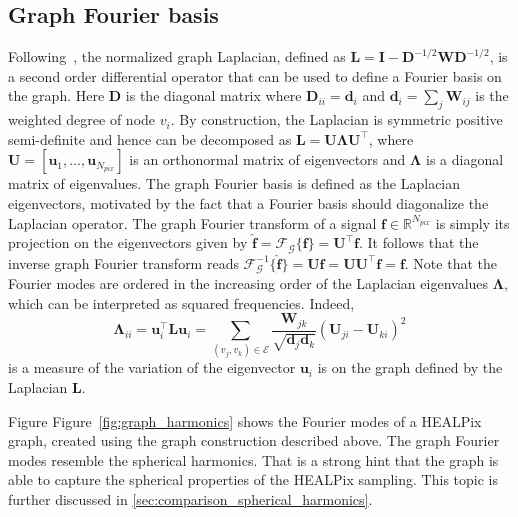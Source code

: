 \documentclass[final,twocolumn,3p,times,authoryear]{elsarticle}
\newcommand{\figref}[1]{Figure~\ref{fig:#1}}
\renewcommand{\b}[1]{{\bm{#1}}}   %
\newcommand{\1}{\b{1}}              %
\newcommand{\0}{\b{0}}              %
\newcommand{\G}{\mathcal{G}}
\newcommand{\E}{\mathcal{E}}
\renewcommand{\L}{\b{L}}
\newcommand{\W}{\b{W}}
\newcommand{\I}{\b{I}}
\newcommand{\D}{\b{D}}
\newcommand{\U}{\b{U}}
\newcommand{\f}{\b{f}}
\newcommand{\trans}{^\intercal}
\newcommand{\R}{\mathbb{R}}
\newcommand{\bLambda}{\b{\Lambda}}
\begin{document}
\subsection{Graph Fourier basis}

Following~\cite{shuman2013emerging}, the normalized graph Laplacian,
defined as $\L = \I - \D^{-1/2} \W \D^{-1/2}$, is a second order differential operator
that can be used to define a Fourier basis on the graph. Here $\D$ is the diagonal
matrix where $\D_{ii} = \b{d}_i$ and $\b{d}_i = \sum_j \W_{ij}$ is the weighted degree of node $v_i$. By construction, the Laplacian is symmetric positive
semi-definite and hence can be decomposed as $\L = \U \bLambda \U\trans$, where $\U = [\b u_1, \ldots, \b u_{N_{pix}}]$ is an
orthonormal matrix of eigenvectors and $\bLambda$ is a diagonal matrix of
eigenvalues. The graph Fourier basis is defined as the Laplacian eigenvectors, motivated by the fact that a Fourier basis should diagonalize the Laplacian operator.
The graph Fourier transform of a signal $\f \in \R^{N_{pix}}$ is simply its projection on the eigenvectors given by
$\hat{\f} = \mathcal{F}_\G \{\f\} = \U\trans \f$. It follows that the inverse graph Fourier transform reads $\mathcal{F}^{-1}_\G \{\hat{\f}\} = \U\hat{\f} = \U \U\trans \f = \f$.
Note that the Fourier modes are ordered in the increasing order of the Laplacian eigenvalues $\bLambda$, which can be interpreted as squared frequencies.
Indeed,
\begin{equation*}
	\bLambda_{ii} = \b u_i\trans \L \b u_i = \sum_{(v_j, v_k) \in \E} \frac{\W_{jk}}{\sqrt{\b d_j \b d_k}} (\U_{ji} - \U_{ki})^2
\end{equation*}
is a measure of the variation of the eigenvector $\b u_i$ is on the graph defined by the Laplacian $\L$.


Figure \figref{graph_harmonics} shows the Fourier modes of a HEALPix graph, created using the graph construction described above.
The graph Fourier modes resemble the spherical harmonics.
That is a strong hint that the graph is able to capture the spherical properties of the HEALPix sampling.
This topic is further discussed in \ref{sec:comparison_spherical_harmonics}.
\end{document}
